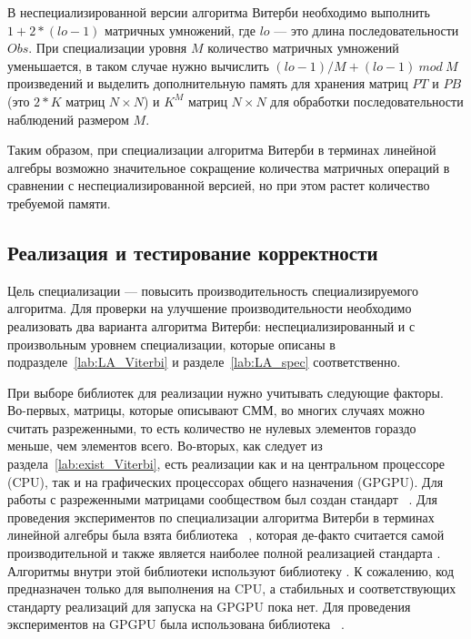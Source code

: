 В неспециализированной версии алгоритма Витерби необходимо 
выполнить $1 + 2 * (lo - 1)$ матричных умножений, где $lo$ 
--- это длина последовательности $Obs$.
При специализации уровня $M$ количество 
матричных умножений уменьшается, в таком случае нужно 
вычислить $\mathit{(lo - 1) / M + (lo - 1)\ mod\ M}$ 
произведений и выделить дополнительную память для хранения 
матриц $PT$ и $PB$ (это $2 * K$ матриц $N \times N$) и $K^{M}$ матриц $N 
\times N$ для обработки последовательности наблюдений 
размером $M$.

Таким образом, при специализации алгоритма Витерби в 
терминах линейной алгебры возможно значительное сокращение 
количества матричных операций в сравнении с 
неспециализированной версией, но при этом растет количество 
требуемой памяти.

\subsection{Реализация и тестирование  корректности}
Цель специализации --- повысить производительность 
специализируемого алгоритма.
Для проверки на улучшение производительности необходимо 
реализовать два варианта алгоритма Витерби: 
неспециализированный и с произвольным уровнем специализации, 
которые описаны в подразделе~\ref{lab:LA_Viterbi} 
и разделе~\ref{lab:LA_spec} соответственно.

При выборе библиотек для реализации нужно учитывать следующие 
факторы.
Во-первых, матрицы, которые описывают СММ, во многих случаях 
можно считать разреженными, то есть количество не нулевых 
элементов гораздо меньше, чем элементов всего.
Во-вторых, как следует из раздела~\ref{lab:exist_Viterbi}, 
есть реализации как и на центральном процессоре (CPU), так и 
на графических процессорах общего назначения (GPGPU).
Для работы с разреженными матрицами сообществом был создан 
стандарт ~\cite{GraphBLAS}.
Для проведения экспериментов по специализации алгоритма 
Витерби в терминах линейной алгебры была взята библиотека 
~\cite{SuiteSparse}, 
которая де-факто считается самой производительной и также 
является наиболее полной реализацией стандарта 
.
Алгоритмы внутри этой библиотеки используют библиотеку 
.
К сожалению, код  
предназначен только для выполнения на CPU, а стабильных и 
соответствующих стандарту  реализаций для 
запуска на GPGPU пока нет.
Для проведения экспериментов на GPGPU была использована 
библиотека ~\cite{CUSP}.

